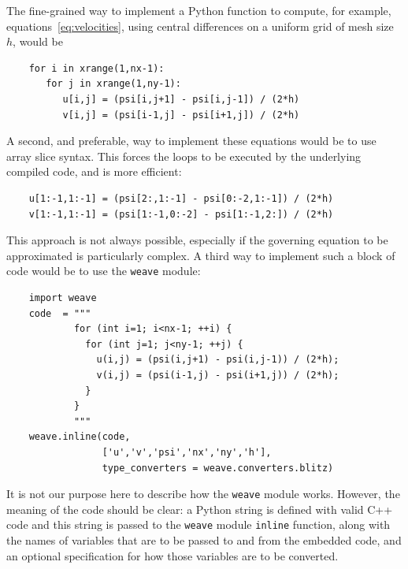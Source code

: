 \documentclass[acmtocl]{acmtrans2m}
\begin{document}
The fine-grained way to implement a Python function to compute, for
example, equations~\ref{eq:velocities}, using central differences on a
uniform grid of mesh size $h$, would be
\begin{verbatim}
    for i in xrange(1,nx-1):
       for j in xrange(1,ny-1):
          u[i,j] = (psi[i,j+1] - psi[i,j-1]) / (2*h)
          v[i,j] = (psi[i-1,j] - psi[i+1,j]) / (2*h)
\end{verbatim}
A second, and preferable, way to implement these equations would be to
use array slice syntax.  This forces the loops to be executed by the
underlying compiled code, and is more efficient:
\begin{verbatim}
    u[1:-1,1:-1] = (psi[2:,1:-1] - psi[0:-2,1:-1]) / (2*h)
    v[1:-1,1:-1] = (psi[1:-1,0:-2] - psi[1:-1,2:]) / (2*h)
\end{verbatim}
This approach is not always possible, especially if the governing
equation to be approximated is particularly complex.  A third way to
implement such a block of code would be to use the {\tt weave} module:
\begin{verbatim}
    import weave
    code  = """
            for (int i=1; i<nx-1; ++i) {
              for (int j=1; j<ny-1; ++j) {
                u(i,j) = (psi(i,j+1) - psi(i,j-1)) / (2*h);
                v(i,j) = (psi(i-1,j) - psi(i+1,j)) / (2*h);
              }
            }
            """
    weave.inline(code,
                 ['u','v','psi','nx','ny','h'],
                 type_converters = weave.converters.blitz)
\end{verbatim}
It is not our purpose here to describe how the {\tt weave} module
works.  However, the meaning of the code should be clear: a Python
string is defined with valid C++ code and this string is passed to the
{\tt weave} module {\tt inline} function, along with the names of
variables that are to be passed to and from the embedded code, and an
optional specification for how those variables are to be converted.
\end{document}

